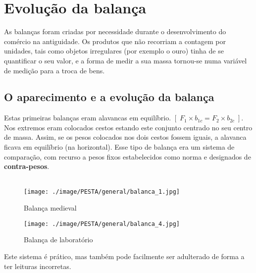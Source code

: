 \chapter{Evolução da balança}
As balanças foram criadas por necessidade durante o desenvolvimento do comércio na antiguidade. Os produtos que não recorriam a contagem por unidades, tais como objetos irregulares (por exemplo o ouro) tinha de se quantificar o seu valor, e a forma de medir a sua massa tornou-se numa variável de medição para a troca de bens.
\section{O aparecimento e a evolução da balança}
Estas primeiras balanças eram alavancas em equilíbrio. $[ \; F_{1} \times b_{1c} = F_{2} \times b_{2c} \; ]$. Nos extremos eram colocados cestos estando este conjunto centrado no seu centro de massa. Assim, se os pesos colocados nos dois cestos fossem iguais, a alavanca ficava em equilíbrio (na horizontal). Esse tipo de balança era um sistema de comparação, com recurso a pesos fixos estabelecidos como norma e designados de \textbf{contra-pesos}.
\\
\\
\begin{minipage}[!b]{0.5\linewidth}
	\begin{figure}[H]
		\flushleft
		\texttt{[image: ./image/PESTA/general/balanca\_1.jpg]}
		\caption{Balança medieval}
		\label{balanca_1}
	\end{figure}
\end{minipage}
\hspace{1cm}
\begin{minipage}[!b]{0.5\linewidth}
	\begin{figure}[H]
		\centering
		\texttt{[image: ./image/PESTA/general/balanca\_4.jpg]}
		\caption{Balança de laboratório}
		\label{balanca_4}
	\end{figure}
\end{minipage}
Este sistema é prático, mas também pode facilmente ser adulterado de forma a ter leituras incorretas.
\\
\\
